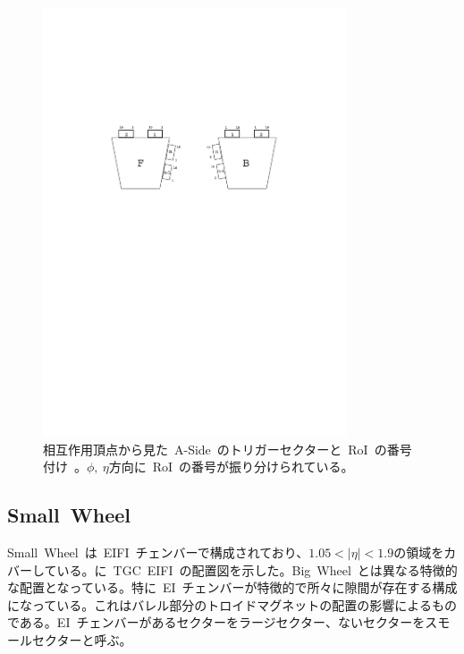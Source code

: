 \begin{figure}[H]
        \centering   
        \includegraphics[width=0.8\textwidth,page=8]{img/pdf/TGC.pdf}
        \caption[トリガーセクターと~RoI~の番号付け]{相互作用頂点から見た~A-Side~のトリガーセクターと~RoI~の番号付け~\cite{TR:02}。$\phi,~\eta$方向に~RoI~の番号が振り分けられている。}
        \label{fig:tgcsector}
\end{figure}

\subsection{Small~Wheel}
Small~Wheel~は~EIFI~チェンバーで構成されており、$1.05<|\eta|<1.9$の領域をカバーしている。に~TGC~EIFI~の配置図を示した。Big~Wheel~とは異なる特徴的な配置となっている。特に~EI~チェンバーが特徴的で所々に隙間が存在する構成になっている。これはバレル部分のトロイドマグネットの配置の影響によるものである。EI~チェンバーがあるセクターをラージセクター、ないセクターをスモールセクターと呼ぶ。

